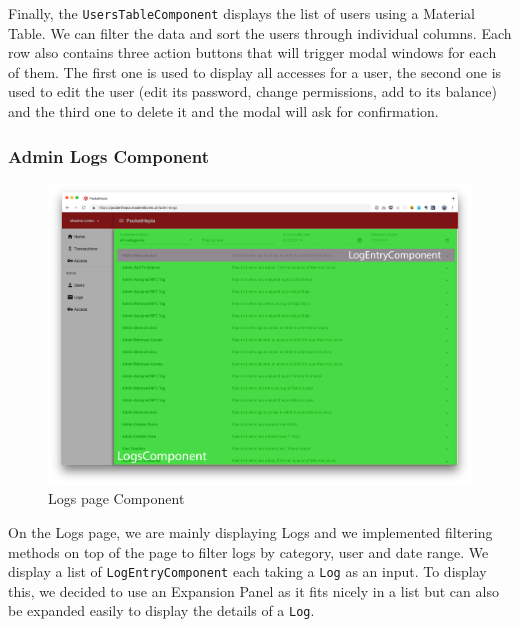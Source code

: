 \documentclass[twoside, openright,11pt,a4paper]{book}
\begin{document}
Finally, the \verb+UsersTableComponent+ displays the list of users using a Material Table\cite{angular:material:component:table}. We can filter the data and sort the users through individual columns. Each row also contains three action buttons that will trigger modal windows for each of them. The first one is used to display all accesses for a user, the second one is used to edit the user (edit its password, change permissions, add to its balance) and the third one to delete it and the modal will ask for confirmation.
\subsubsection{Admin Logs Component}
\begin{figure}[H]
\begin{center}
	\includegraphics[width=\textwidth]{assets/screens/angular/logs}
	\caption{Logs page Component}
			\label{logs_screen}
\end{center}
\end{figure}
On the Logs page, we are mainly displaying Logs and we implemented filtering methods on top of the page to filter logs by category, user and date range. We display a list of \verb+LogEntryComponent+ each taking a \verb+Log+ as an input. To display this, we decided to use an Expansion Panel\cite{angular:material:component:expansion_panel} as it fits nicely in a list but can also be expanded easily to display the details of a \verb+Log+.
\end{document}
